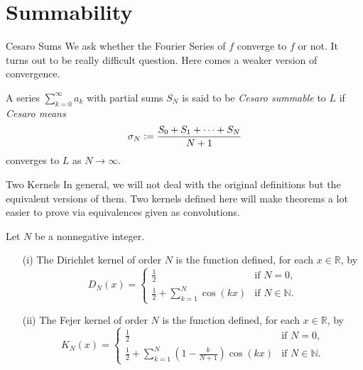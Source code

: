 \documentclass{beamer}
\begin{document}
\section{Summability}


\begin{frame}{Cesaro Sums}
    We ask whether the Fourier Series of $f$ converge to $f$ or not. It turns out to be really difficult question. Here comes a weaker version of convergence.
    \begin{definition}
        A series $\sum_{k=0}^{\infty} a_k$ with partial sums $S_N$ is said to be \textit{Cesaro summable} to $L$ if \textit{Cesaro means}
    \[
    \sigma_N \vcentcolon =  \frac{S_0 + S_1 + \dots + S_N }{N+1}
    \]
    converges to $L$ as $N \longrightarrow \infty$.
    \end{definition}


\end{frame}

    \begin{frame}{Two Kernels}
    \small
    In general, we will not deal with the original definitions but the equivalent versions of them. Two kernels defined here will make theorems a lot easier to prove via equivalences given as convolutions.
    \begin{definition}[Kernels]
        Let $N$ be a nonnegative integer.
\begin{enumerate}
  \item[(i)] The Dirichlet kernel of order $N$ is the function defined, for each $x \in \mathbb{R}$, by
  \[
  D_N(x) = \begin{cases}
            \frac{1}{2} & \text{if } N = 0, \\
            \frac{1}{2}  + \sum_{k=1}^{N} \cos(kx) & \text{if } N \in \mathbb{N}.
           \end{cases}
  \]

  \item[(ii)] The Fejer kernel of order $N$ is the function defined, for each $x \in \mathbb{R}$, by
  \[
  K_N(x) = \begin{cases}
            \frac{1}{2} & \text{if } N = 0, \\
            \frac{1}{2} + \sum_{k=1}^{N}\left( 1 - \frac{k}{N + 1} \right)\cos(kx) & \text{if } N \in \mathbb{N}.
           \end{cases}
  \]
\end{enumerate}
    \end{definition}

\end{frame}
\end{document}
